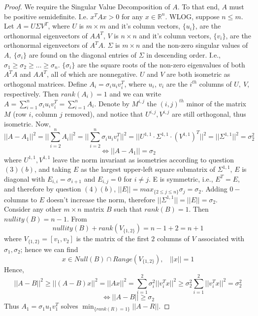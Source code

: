 \documentclass[11pt]{article}
\theoremstyle{quest}
\begin{document}
\begin{proof}
We require the Singular Value Decomposition of $A$. To that end, $A$ must be positive semidefinite. I.e. $x^TAx > 0$ for any $x \in \mathbb{R}^n$. WLOG, suppose $n \le m$. Let $A = U \Sigma V^T$, where $U$ is $m \times m$ and it's column vectors, $\{u_i\}$, are the orthonormal eigenvectors of $AA^T$, $V$ is $n \times n$ and it's column vectors, $\{v_i\}$, are the orthonormal eigenvectors of $A^TA$. $\Sigma$ is $m \times n$ and the non-zero singular values of $A,\ \{\sigma_i\}$ are found on the diagonal entries of $\Sigma$ in descending order. I.e., $\sigma_1 \ge \sigma_2 \ge \ldots \ge \sigma_n$. $\{\sigma_i\}$ are the square roots of the non-zero eigenvalues of both $A^TA$ and $AA^T$, all of which are nonnegative. $U$ and $V$ are both isometric as orthogonal matrices. Define $A_i = \sigma_i u_iv_i^T$, where $u_i$, $v_i$ are the $i^{th}$ columns of $U,\ V$, respectively. Then $rank(A_i) = 1$ and we can write $A = \sum_{i = 1}^n \sigma_i u_iv_i^T = \sum_{i = 1}^n A_i$. Denote by $M^{i,j}$ the $(i, j)^{th}$ minor of the matrix $M$ (row $i$, column $j$ removed), and notice that $U^{i,j}, V^{i,j}$ are still orthogonal, thus isometric. Now,
$$||A - A_1||^2 = ||\sum_{i=2}^n A_i||^2 = ||\sum_{i=2}^n \sigma_i u_i v_i^T||^2 = ||U^{1,1} \cdot \Sigma^{1,1} \cdot (V^{1,1})^T||^2 = ||\Sigma^{1,1}||^2 = \sigma_2^2$$
$$\iff ||A - A_1|| = \sigma_2$$
where $U^{1,1}, V^{1,1}$ leave the norm invariant as isometries according to question $(3)(b)$, and taking $E$ as the largest upper-left square submatrix of $\Sigma^{1,1}$, $E$ is diagonal with $E_{i,i} = \sigma_{i+1}$ and $E_{i,j} = 0$ for $i \ne j$. E is symmetric, i.e., $E^T=E$, and therefore by question $(4)(b)$, $||E|| = max_{\{2 \le j \le n\}} \sigma_j = \sigma_2$. Adding $0-$columns to $E$ doesn't increase the norm, therefore $||\Sigma^{1,1}||=||E|| = \sigma_2$.
\\Consider any other $m \times n$ matrix $B$ such that $rank(B) = 1$. Then $nullity(B) = n-1$. From
$$nullity(B) + rank(V_{\{1,2\}}) = n - 1 + 2 = n+1$$
where $V_{\{1,2\}}=[v_1, v_2]$ is the matrix of the first $2$ columns of $V$ associated with $\sigma_1, \sigma_2$; hence we can find
$$x \in Null(B) \cap Range(V_{\{1,2\}}),\ \ \ \ ||x|| = 1$$
Hence,
$$||A-B||^2 \ge ||(A-B)x||^2 = ||Ax||^2  = \sum_{i=1}^2 \sigma_i^2 ||v_i^T x||^2 \ge \sigma_2^2 \sum_{i=1}^2||v_i^T x||^2 = \sigma_2^2$$
$$\iff ||A-B|| \ge \sigma_2$$
Thus $A_1 = \sigma_1 u_1 v_1^T$ solves $ \min_{\{rank(R) = 1\}}||A-R||$.
\end{proof}
\end{document}
